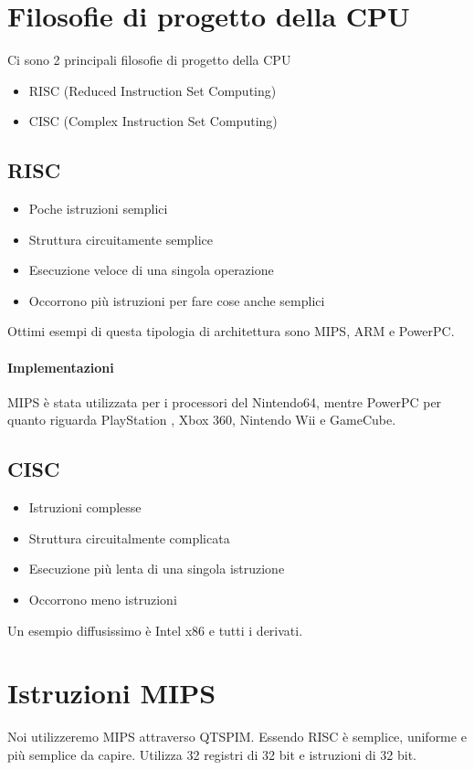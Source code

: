 \documentclass[12pt, a4paper, openany]{book}
\begin{document}
\section{Filosofie di progetto della CPU}
Ci sono 2 principali filosofie di progetto della CPU
\begin{itemize}
    \item RISC (Reduced Instruction Set Computing)
    \item CISC (Complex Instruction Set Computing)
\end{itemize}
\subsection{RISC}
\begin{itemize}
    \item Poche istruzioni semplici
    \item Struttura circuitamente semplice
    \item Esecuzione veloce di una singola operazione
    \item Occorrono più istruzioni per fare cose anche semplici
\end{itemize}
Ottimi esempi di questa tipologia di architettura sono MIPS, ARM e PowerPC.
\paragraph{Implementazioni} MIPS è stata utilizzata per i processori del Nintendo64,
mentre PowerPC per quanto riguarda PlayStation , Xbox 360, Nintendo Wii e GameCube.

\subsection{CISC}
\begin{itemize}
    \item Istruzioni complesse
    \item Struttura circuitalmente complicata
    \item Esecuzione più lenta di una singola istruzione
    \item Occorrono meno istruzioni
\end{itemize}
Un esempio diffusissimo è Intel x86 e tutti i derivati.

\section{Istruzioni MIPS}
Noi utilizzeremo MIPS attraverso QTSPIM.
Essendo RISC è semplice, uniforme e più semplice da capire. 
Utilizza 32 registri di 32 bit e istruzioni di 32 bit.
\end{document}
